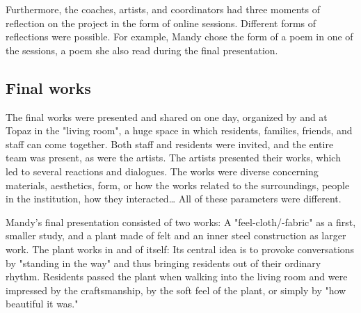 \documentclass[authordate, empirical]{jote-new-article}
\begin{document}
	Furthermore, the coaches, artists, and coordinators had three moments of reflection on the project in the form of online sessions. Different forms of reflections were possible. For example, Mandy chose the form of a poem in one of the sessions, a poem she also read during the final presentation.







	\subsection{Final works}







	The final works were presented and shared on one day, organized by and at Topaz in the "living room", a huge space in which residents, families, friends, and staff can come together. Both staff and residents were invited, and the entire team was present, as were the artists. The artists presented their works, which led to several reactions and dialogues. The works were diverse concerning materials, aesthetics, form, or how the works related to the surroundings, people in the institution, how they interacted… All of these parameters were different.







	Mandy's final presentation consisted of two works: A "feel-cloth/-fabric" as a first, smaller study, and a plant made of felt and an inner steel construction as larger work. The plant works in and of itself: Its central idea is to provoke conversations by "standing in the way" and thus bringing residents out of their ordinary rhythm. Residents passed the plant when walking into the living room and were impressed by the craftsmanship, by the soft feel of the plant, or simply by "how beautiful it was."
\end{document}
